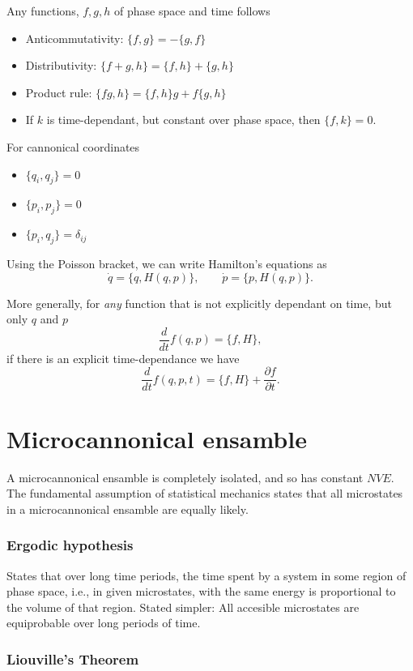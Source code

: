 \documentclass[a4paper, 11pt, notitlepage, english]{article}
\newcommand{\p}{\partial}
\begin{document}
Any functions, $f, g, h$ of phase space and time follows
\begin{itemize}
	\item Anticommutativity: $\{f, g\} = - \{g, f\}$
	\item Distributivity: $\{f+g, h\} = \{f, h\} + \{g, h\}$
	\item Product rule: $\{fg, h\} = \{f, h\}g + f\{g, h\}$
	\item If $k$ is time-dependant, but constant over phase space, then $\{f,k\} = 0$.
\end{itemize}
For cannonical coordinates
\begin{itemize}
	\item $\{q_i, q_j\} = 0$
	\item $\{p_i, p_j\} = 0$
	\item $\{p_i, q_j\} = \delta_{ij}$
\end{itemize}

Using the Poisson bracket, we can write Hamilton's equations as
$$\dot{q} = \{q, H(q,p)\}, \qquad \dot{p} = \{p, H(q,p)\}.$$

More generally, for \emph{any} function that is not explicitly dependant on time, but only $q$ and $p$
$$\frac{d}{dt}f(q,p) = \{f, H\},$$
if there is an explicit time-dependance we have
$$\frac{d}{dt}f(q,p,t) = \{f, H\} + \frac{\p f}{\p t}.$$

\clearpage

\section*{Microcannonical ensamble}
A microcannonical ensamble is completely isolated, and so has constant $NVE$. The fundamental assumption of statistical mechanics states that all microstates in a microcannonical ensamble are equally likely.

\subsubsection*{Ergodic hypothesis}

States that over long time periods, the time spent by a system in some region of phase space, i.e., in given microstates, with the same energy is proportional to the volume of that region. Stated simpler: All accesible microstates are equiprobable over long periods of time.

\subsubsection*{Liouville's Theorem}
\end{document}
